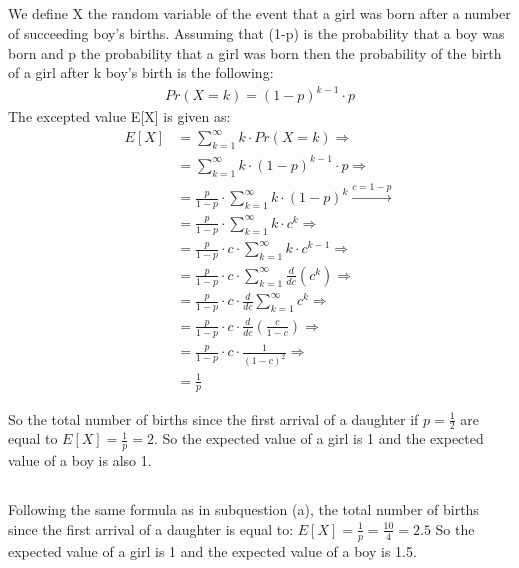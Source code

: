 \documentclass[11pt]{537homework}
\begin{document}
\subsection{}
We define X the random variable of the event that a girl was born after a number of succeeding boy's births. Assuming that (1-p) is the probability that a boy was born and p the probability that a girl was born then  the probability of the birth of a girl after k boy's birth is the following:
\begingroup
\allowdisplaybreaks
\begin{align*}
     Pr(X=k) = (1-p)^{k-1} \cdot p 
\end{align*}
\endgroup
The excepted value E[X] is given as:
\begingroup
\allowdisplaybreaks
\begin{align*}
     E[X] &= \sum_{k=1}^{\infty} k \cdot Pr(X=k) \Longrightarrow\\
          &= \sum_{k=1}^{\infty} k \cdot (1-p)^{k-1} \cdot p \Longrightarrow\\
          &= \frac{p}{1-p} \cdot \sum_{k=1}^{\infty} k \cdot (1-p)^{k} \xrightarrow{c = 1-p}\\
          &= \frac{p}{1-p} \cdot \sum_{k=1}^{\infty} k \cdot c^{k} \Longrightarrow\\
          &= \frac{p}{1-p} \cdot c \cdot \sum_{k=1}^{\infty} k \cdot c^{k-1} \Longrightarrow\\
          &= \frac{p}{1-p} \cdot c \cdot \sum_{k=1}^{\infty} \frac{d}{dc} (c^{k}) \Longrightarrow\\
          &= \frac{p}{1-p} \cdot c \cdot \frac{d}{dc} \sum_{k=1}^{\infty} c^{k} \Longrightarrow\\
          &= \frac{p}{1-p} \cdot c \cdot \frac{d}{dc} (\frac{c}{1-c}) \Longrightarrow\\
          &= \frac{p}{1-p} \cdot c \cdot \frac{1}{(1-c)^{2}} \Longrightarrow\\
          &= \frac{1}{p}
\end{align*}
\endgroup

So the total number of births since the first arrival of a daughter if $p=\frac{1}{2}$ are equal to $E[X] = \frac{1}{p} =  2$. So the expected value of a girl is 1 and the expected value of a boy is also 1.
\subsection{}
Following the same formula as in subquestion (a), the total number of births since the first arrival of a daughter is equal to: $E[X] = \frac{1}{p} = \frac{10}{4} = 2.5$ So the expected value of a girl is 1 and the expected value of a boy is 1.5.
\end{document}
